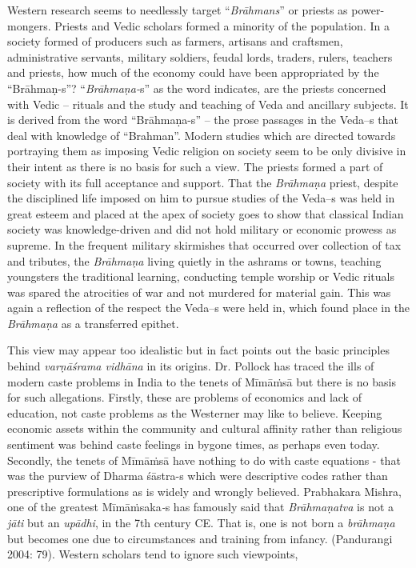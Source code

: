 Western research seems to needlessly target “\textit{Brāhmans}” or priests as power-mongers. Priests and Vedic scholars formed a minority of the population. In a society formed of producers such as farmers, artisans and craftsmen, administrative servants, military soldiers, feudal lords, traders, rulers, teachers and priests, how much of the economy could have been appropriated by the “Brāhmaṇ-s”? “\textit{Brāhmaṇa-}s” as the word indicates, are the priests concerned with Vedic – rituals and the study and teaching of Veda and ancillary subjects. It is derived from the word “Brāhmaṇa-s” – the prose passages in the Veda--s that deal with knowledge of “Brahman”. Modern studies which are directed towards portraying them as imposing Vedic religion on society seem to be only divisive in their intent as there is no basis for such a view. The priests formed a part of society with its full acceptance and support. That the \textit{Brāhmaṇa} priest, despite the disciplined life imposed on him to pursue studies of the Veda--s was held in great esteem and placed at the apex of society goes to show that classical Indian society was knowledge-driven and did not hold military or economic prowess as supreme. In the frequent military skirmishes that occurred over collection of tax and tributes, the \textit{Brāhmaṇa} living quietly in the ashrams or towns, teaching youngsters the traditional learning, conducting temple worship or Vedic rituals was spared the atrocities of war and not murdered for material gain. This was again a reflection of the respect the Veda--s were held in, which found place in the \textit{Brāhmaṇa} as a transferred epithet.

This view may appear too idealistic but in fact points out the basic principles behind \textit{varṇāśrama vidhāna} in its origins. Dr. Pollock has traced the ills of modern caste problems in India to the tenets of Mīmāṁsā but there is no basis for such allegations. Firstly, these are problems of economics and lack of education, not caste problems as the Westerner may like to believe. Keeping economic assets within the community and cultural affinity rather than religious sentiment was behind caste feelings in bygone times, as perhaps even today. Secondly, the tenets of Mīmāṁsā have nothing to do with caste equations - that was the purview of Dharma śāstra-s which were descriptive codes rather than prescriptive formulations as is widely and wrongly believed. Prabhakara Mishra, one of the greatest Mīmāṁsaka\textit{-}s has famously said that \textit{Brāhmaṇatva} is not a \textit{jāti} but an \textit{upādhi}, in the 7th century CE. That is, one is not born a \textit{brāhmaṇa} but becomes one due to circumstances and training from infancy. (Pandurangi 2004: 79). Western scholars tend to ignore such viewpoints,

